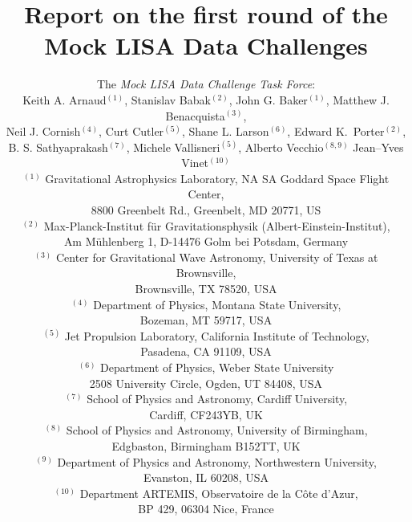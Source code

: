 \documentclass[11pt]{article}
\begin{document}
\title{\bf Report on the first round of the Mock LISA Data Challenges}

\author{The \emph{Mock LISA Data Challenge Task Force}: \\ [5pt]
Keith A. Arnaud$^{(1)}$,
Stanislav Babak$^{(2)}$,
John G. Baker$^{(1)}$,
Matthew J. Benacquista$^{(3)}$, \\
Neil J. Cornish$^{(4)}$,
Curt Cutler$^{(5)}$,
Shane L. Larson$^{(6)}$,
Edward K.~Porter$^{(2)}$, \\
B. S. Sathyaprakash$^{(7)}$,
Michele Vallisneri$^{(5)}$,
Alberto Vecchio$^{(8,9)}$
Jean--Yves Vinet$^{(10)}$\\ [20pt]
\small $^{(1)}$ Gravitational Astrophysics Laboratory, NA SA Goddard Space Flight Center, \\ 
\small 8800 Greenbelt Rd., Greenbelt, MD 20771, US \\
\small $^{(2)}$ Max-Planck-Institut f\"ur Gravitationsphysik (Albert-Einstein-Institut), \\ 
\small Am M\"uhlenberg 1, D-14476 Golm bei Potsdam, Germany \\
\small $^{(3)}$ Center for Gravitational Wave Astronomy, University of Texas at Brownsville, \\ 
\small Brownsville, TX 78520, USA \\
\small $^{(4)}$ Department of Physics, Montana State University, \\
\small Bozeman, MT 59717, USA \\ 
\small $^{(5)}$ Jet Propulsion Laboratory, California Institute of Technology, \\ 
\small Pasadena, CA 91109, USA \\
\small $^{(6)}$ Department of Physics, Weber State University \\
\small 2508 University Circle, Ogden, UT 84408, USA \\ 
\small $^{(7)}$ School of Physics and Astronomy, Cardiff University, \\ 
\small Cardiff, CF243YB, UK \\
\small $^{(8)}$ School of Physics and Astronomy, University of Birmingham, \\ 
\small Edgbaston, Birmingham B152TT, UK \\
\small $^{(9)}$ Department of Physics and Astronomy, Northwestern University, \\ 
\small Evanston, IL 60208, USA \\
\small $^{(10)}$ Department ARTEMIS, Observatoire de la C\^ote d'Azur, \\ 
\small BP 429, 06304 Nice, France \\ [20pt]
}
\end{document}
